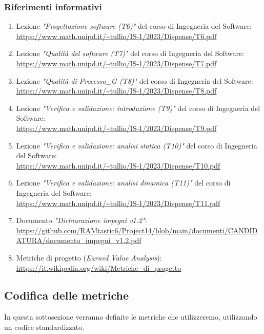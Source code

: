 \subsubsection{Riferimenti informativi}
\label{sec:rif_inf}
\begin{enumerate}
    \item Lezione \emph{"Progettazione software (T6)"} del corso di Ingegneria del Software: \\
    \url{https://www.math.unipd.it/~tullio/IS-1/2023/Dispense/T6.pdf}
    \item Lezione \emph{"Qualità del software (T7)"} del corso di Ingegneria del Software: \\
    \url{https://www.math.unipd.it/~tullio/IS-1/2023/Dispense/T7.pdf}
    \item Lezione \emph{"Qualità di \textit{Processo_G} (T8)"} del corso di Ingegneria del Software: \\
    \url{https://www.math.unipd.it/~tullio/IS-1/2023/Dispense/T8.pdf}
    \item Lezione \emph{"Verifica e validazione: introduzione (T9)"} del corso di Ingegneria del Software: \\
    \url{https://www.math.unipd.it/~tullio/IS-1/2023/Dispense/T9.pdf}
    \item Lezione \emph{"Verifica e validazione: analisi statica (T10)"} del corso di Ingegneria del Software: \\
    \url{https://www.math.unipd.it/~tullio/IS-1/2023/Dispense/T10.pdf}
    \item Lezione \emph{"Verifica e validazione: analisi dinamica (T11)"} del corso di Ingegneria del Software: \\
    \url{https://www.math.unipd.it/~tullio/IS-1/2023/Dispense/T11.pdf}
     \item Documento \emph{"Dichiarazione impegni v1.2"}: \\ \url{https://github.com/RAMtastic6/Project14/blob/main/documenti/CANDIDATURA/documento_impegni_v1.2.pdf}
     \item Metriche di progetto (\emph{Earned Value Analysis}):\\
     \url{https://it.wikipedia.org/wiki/Metriche_di_progetto}
\end{enumerate}
\subsection{Codifica delle metriche}
In questa sottosezione verranno definite le metriche che utilizzeremo, utilizzando un codice standardizzato.

